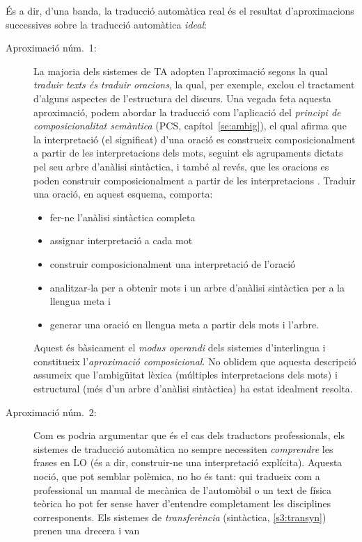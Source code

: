 És a dir, d'una banda, la traducció automàtica real és el resultat
d'aproximacions successives sobre la traducció automàtica \emph{ideal}:
\begin{description}
\item[Aproximació núm.\ 1:] La majoria dels sistemes de TA adopten
  l'aproximació segons la qual \emph{traduir texts és traduir
    oracions}, la qual, per exemple, exclou el tractament d'alguns
  aspectes de l'estructura del discurs. Una vegada feta aquesta
  aproximació, podem abordar la traducció com l'aplicació del
  \emph{principi de composicionalitat semàntica} (PCS,
  capítol~\ref{se:ambig}), el qual afirma que la interpretació (el
  significat) d'una oració es construeix composicionalment a partir de
  les interpretacions dels mots, seguint els agrupaments dictats pel
  seu arbre d'anàlisi sintàctica, i també al revés, que les oracions
  es poden construir composicionalment a partir de les interpretacions
  \citep{tellier00p}. Traduir una oració, en aquest esquema, comporta:
  \begin{itemize}
  \item fer-ne l'anàlisi sintàctica completa
  \item assignar interpretació a cada mot
  \item construir composicionalment una interpretació de l'oració
  \item analitzar-la per a obtenir mots i un arbre d'anàlisi
    sintàctica per a la llengua meta i
  \item generar una oració en llengua meta a partir dels mots i
    l'arbre.
  \end{itemize}
  Aquest és bàsicament el \emph{modus
    operandi} dels sistemes d'interlingua i constitueix
    l'\emph{aproximació composicional}. No oblidem que aquesta
    descripció assumeix que l'ambigüitat lèxica (múltiples
    interpretacions dels mots) i estructural (més d'un arbre d'anàlisi
    sintàctica) ha estat
    idealment resolta.
  \item[Aproximació núm.\ 2:] Com es podria argumentar que és el cas
    dels traductors professionals, els sistemes de traducció
    automàtica no sempre necessiten \emph{comprendre} les frases en LO
    (és a dir, construir-ne una interpretació explícita). Aquesta
    noció, que pot semblar polèmica, no ho és tant: qui tradueix com a
    professional un manual de mecànica de l'automòbil o un text de
    física teòrica ho pot fer sense haver d'entendre completament les
    disciplines corresponents. Els sistemes de \emph{transferència}
    (sintàctica, \ref{s3:transyn}) prenen una drecera i van

\end{description}
